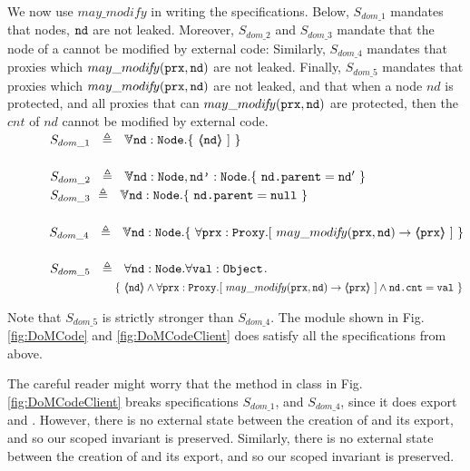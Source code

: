 \noindent
We now use $may\_modify$ in writing the specifications.
Below, $S_{dom\_1}$ mandates  that nodes, $\mbox{\normalfont{\texttt{nd}}}$ are not leaked. 
Moreover, $S_{dom\_2}$  and $S_{dom\_3}$   mandate that the  node of a  cannot be modified by external code: 
{Similarly, $S_{dom\_4}$ mandates  that proxies which $may\_modi\!f\!y(\mbox{\normalfont{\texttt{prx}}},\mbox{\normalfont{\texttt{nd}}})$ are not leaked.}
{Finally, $S_{dom\_5}$ mandates   that proxies which $may\_modi\!f\!y(\mbox{\normalfont{\texttt{prx}}},\mbox{\normalfont{\texttt{nd}}})$ are not leaked, and that when a node $nd$ is protected, and  all proxies that can  $may\_modi\!f\!y(\mbox{\normalfont{\texttt{prx}}},\mbox{\normalfont{\texttt{nd}}})$ are protected, then  the $cnt$ of $nd$ cannot be modified by external code.}
\\
$\strut \SPSP  S_{dom\_1}\ \  \triangleq \ \ \TwoStatesN{ \prg{nd}:\prg{Node}}{\  \inside{\prg{nd}}\  ] \ }$ 
\\
\\
$\strut \SPSP  S_{dom\_2}\ \  \triangleq \ \ \TwoStatesN{ \prg{nd}:\prg{Node},\prg{nd'}:\prg{Node}}{\  \prg{nd.parent}=\prg{nd}'   \ }$ 
\\
$\strut \SPSP  S_{dom\_3} \  \triangleq \ \ \TwoStatesN{ \prg{nd}:\prg{Node} }{\  \prg{nd.parent}=\prg{null} \ }$ 
\\
\noindent
\\
$\strut \SPSP  S_{dom\_4}\ \  \triangleq \ \ \TwoStatesN{ \prg{nd}:\prg{Node}}{\  \forall \prg{prx}:\prg{Proxy}.[ \ may\_modi\!f\!y(\prg{prx}, \prg{nd}) \rightarrow \inside{\prg{prx}}\  ] \ }$ 
\\
\\
$\strut \SPSP  S_{dom\_5}\ \  \triangleq \ \  \forall{ \prg{nd}:\prg{Node}.\forall \prg{val}:\prg{Object} }$.\\
$\strut \SPSP\strut  \SPSP\strut \SPSP	\{  \  \inside{\prg{nd}} \wedge \forall \prg{prx}:\prg{Proxy}.[ \ may\_modi\!f\!y(\prg{prx}, \prg{nd} ) \rightarrow \inside{\prg{prx}}\  ]  \wedge \prg{nd.cnt} = \prg{val} \ \}  $ 


 Note that $S_{dom\_5}$ is strictly stronger than $S_{dom\_4}$. 
The module shown in Fig. \ref{fig:DoMCode} and \ref{fig:DoMCodeClient} does satisfy  all the  specifications from above. 

The careful reader might worry that the method  in class  in Fig. \ref{fig:DoMCodeClient} 
breaks specifications $S_{dom\_1}$, and $S_{dom\_4}$, since it does export   and . 
However, there is no external state between the creation of    and its export, and so our scoped invariant is preserved. 
Similarly, there is no external state between the creation of    and its export, and so our scoped invariant is preserved. 


